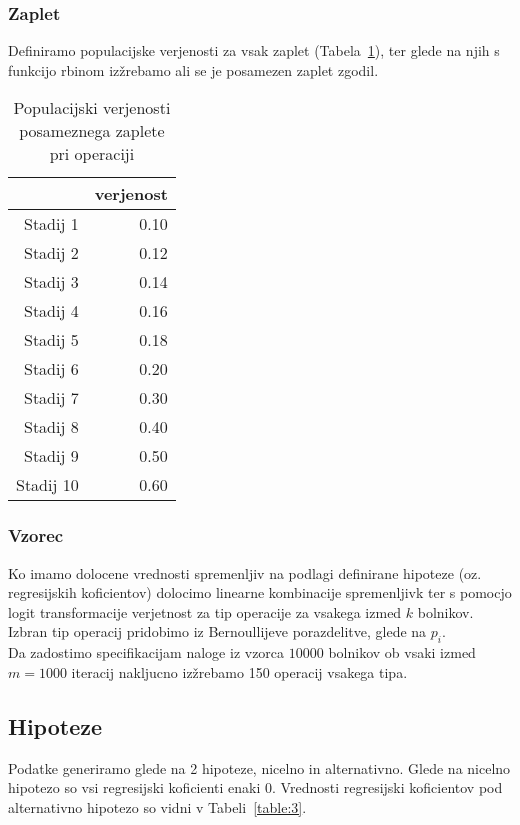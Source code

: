 \documentclass[letterpaper,11pt]{article}
\begin{document}
\subsubsection{Zaplet}
Definiramo populacijske verjenosti za vsak zaplet (Tabela~\ref{table:2}), ter glede na njih s funkcijo rbinom izžrebamo ali se je posamezen zaplet zgodil.

\begin{table}[ht]
\centering
\begin{tabular}{rr}
  \hline
 & verjenost \\ 
  \hline
Stadij 1 & 0.10 \\ 
  Stadij 2 & 0.12 \\ 
  Stadij 3 & 0.14 \\ 
  Stadij 4 & 0.16 \\ 
  Stadij 5 & 0.18 \\ 
  Stadij 6 & 0.20 \\ 
  Stadij 7 & 0.30 \\ 
  Stadij 8 & 0.40 \\ 
  Stadij 9 & 0.50 \\ 
  Stadij 10 & 0.60 \\ 
   \hline
\end{tabular}
\caption{Populacijski verjenosti posameznega zaplete pri operaciji} 
\label{table:2}
\end{table}

\subsubsection{Vzorec}
Ko imamo dolocene vrednosti spremenljiv na podlagi definirane hipoteze (oz. regresijskih koficientov) dolocimo linearne kombinacije spremenljivk ter s pomocjo logit transformacije verjetnost za tip operacije za vsakega izmed $k$ bolnikov. Izbran tip operacij pridobimo iz Bernoullijeve porazdelitve, glede na $p_i$. \\
Da zadostimo specifikacijam naloge iz vzorca $10000$ bolnikov ob vsaki izmed $m=1000$ iteracij nakljucno izžrebamo 150 operacij vsakega tipa.

\subsection{Hipoteze}
Podatke generiramo glede na 2 hipoteze, nicelno in alternativno. Glede na nicelno hipotezo so vsi regresijski koficienti enaki 0. Vrednosti regresijski koficientov pod alternativno hipotezo so vidni v Tabeli~\ref{table:3}.
\end{document}
